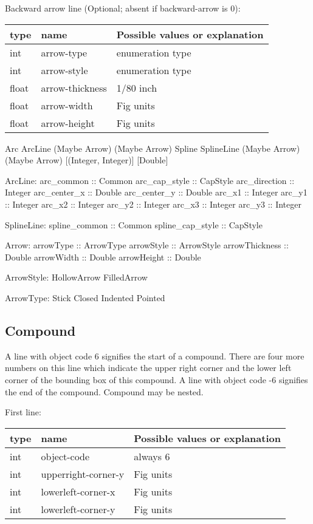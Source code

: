 \documentclass[10pt, a4paper]{article}
\begin{document}
    Backward arrow line (Optional; absent if backward-arrow is 0):

\begin{tabular}{|lll|}
\hline
type & name & Possible values or explanation \\
\hline
\hline
int    & arrow-type              & enumeration type \\
int    & arrow-style             & enumeration type \\
float  & arrow-thickness         & 1/80 inch \\
float  & arrow-width             & Fig units \\
float  & arrow-height            & Fig units \\
\hline
\end{tabular}


Arc ArcLine (Maybe Arrow) (Maybe Arrow)	 
Spline SplineLine (Maybe Arrow) (Maybe Arrow) [(Integer, Integer)] [Double]

ArcLine:
arc\_common :: Common
arc\_cap\_style :: CapStyle
arc\_direction :: Integer
arc\_center\_x :: Double
arc\_center\_y :: Double
arc\_x1 :: Integer
arc\_y1 :: Integer
arc\_x2 :: Integer
arc\_y2 :: Integer
arc\_x3 :: Integer
arc\_y3 :: Integer

SplineLine:
spline\_common :: Common
spline\_cap\_style :: CapStyle

Arrow:
arrowType :: ArrowType
arrowStyle :: ArrowStyle
arrowThickness :: Double
arrowWidth :: Double
arrowHeight :: Double


ArrowStyle:
HollowArrow	 
FilledArrow	 


ArrowType:
Stick	 
Closed	 
Indented	 
Pointed	 


 
\subsection{Compound}\label{subsec:compound}


A line with object code 6 signifies the start of a compound.
    There are four more numbers on this line which indicate the
    upper right corner and the lower left corner of the bounding
    box of this compound.  A line with object code -6 signifies
    the end of the compound.  Compound may be nested.

   First line:

\begin{tabular}{|lll|}
\hline
type & name & Possible values or explanation \\
\hline
\hline
int & object-code             & always 6 \\
int & upperright-corner-y     & Fig units \\
int & lowerleft-corner-x      & Fig units \\
int & lowerleft-corner-y      & Fig units \\
\hline
\end{tabular}
\end{document}
